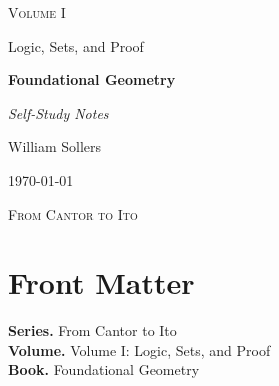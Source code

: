 \documentclass[12pt, a4paper]{report}
\begin{document}
\ExplSyntaxOff
\renewcommand{\familydefault}{\rmdefault}

\begin{titlepage}
\centering
\vspace*{3.5cm}

{\Large\scshape Volume I\par}
\vspace{0.35cm}
{\large Logic, Sets, and Proof\par}

\vspace{1.4cm}

{\Huge\bfseries Foundational Geometry\par}

\vspace{0.6cm}
{\large\itshape Self-Study Notes\par}

\vfill

{\large William Sollers\par}
\vspace{0.35cm}
{\large \today\par}

\vfill

{\large\scshape From Cantor to Ito\par}
\end{titlepage}

\clearpage
\thispagestyle{plain}
\chapter*{Front Matter}
\noindent\textbf{Series.} From Cantor to Ito\\[0.5em]
\textbf{Volume.} Volume I: Logic, Sets, and Proof\\[0.5em]
\textbf{Book.} Foundational Geometry

\clearpage
\tableofcontents
\clearpage
{}



\clearpage



\printindex[tech]
\printindex[dep]
\end{document}

